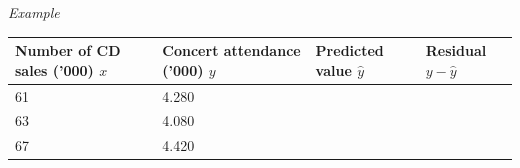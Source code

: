 \documentclass[]{book}
\begin{document}
\emph{Example}

\begin{longtable}[]{@{}llll@{}}
\toprule
\begin{minipage}[b]{0.27\columnwidth}\raggedright
Number of CD sales ('000) \(x\)\strut
\end{minipage} & \begin{minipage}[b]{0.25\columnwidth}\raggedright
Concert attendance ('000) \(y\)\strut
\end{minipage} & \begin{minipage}[b]{0.20\columnwidth}\raggedright
Predicted value \(\hat{y}\)\strut
\end{minipage} & \begin{minipage}[b]{0.17\columnwidth}\raggedright
Residual \(y-\hat{y}\)\strut
\end{minipage}\tabularnewline
\midrule
\endhead
\begin{minipage}[t]{0.27\columnwidth}\raggedright
61\strut
\end{minipage} & \begin{minipage}[t]{0.25\columnwidth}\raggedright
4.280\strut
\end{minipage} & \begin{minipage}[t]{0.20\columnwidth}\raggedright
\strut
\end{minipage} & \begin{minipage}[t]{0.17\columnwidth}\raggedright
\strut
\end{minipage}\tabularnewline
\begin{minipage}[t]{0.27\columnwidth}\raggedright
63\strut
\end{minipage} & \begin{minipage}[t]{0.25\columnwidth}\raggedright
4.080\strut
\end{minipage} & \begin{minipage}[t]{0.20\columnwidth}\raggedright
\strut
\end{minipage} & \begin{minipage}[t]{0.17\columnwidth}\raggedright
\strut
\end{minipage}\tabularnewline
\begin{minipage}[t]{0.27\columnwidth}\raggedright
67\strut
\end{minipage} & \begin{minipage}[t]{0.25\columnwidth}\raggedright
4.420\strut
\end{minipage} & \begin{minipage}[t]{0.20\columnwidth}\raggedright
\strut
\end{minipage} & \begin{minipage}[t]{0.17\columnwidth}\raggedright

\end{minipage}
\end{longtable}
\end{document}
